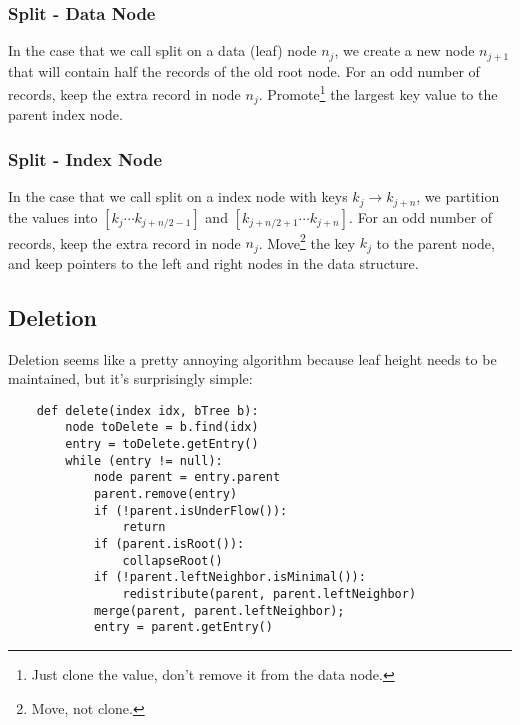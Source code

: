                     \subsubsection{Split - Data Node} %
                    \label{ssub:split_data_node}
                        In the case that we call split on a data (leaf) node $n_j$, we create a new node $n_{j+1}$ that will contain half the records of the old root node.
                        For an odd number of records, keep the extra record in node $n_j$.
                        Promote\footnote{Just clone the value, don't remove it from the data node.} the largest key value to the parent index node.
                    \subsubsection{Split - Index Node} %
                    \label{ssub:split_index_node}
                        In the case that we call split on a index node with keys $k_j \to k_{j+n}$, we partition the values into $[k_j \cdots k_{j+ n/2 - 1}]$ and $[k_{j+ n/2 + 1} \cdots  k_{j+n}]$.
                        For an odd number of records, keep the extra record in node $n_j$.
                        Move\footnote{Move, not clone.} the key $k_j$ to the parent node, and keep pointers to the left and right nodes in the data structure.
                \subsection{Deletion} %
                \label{sub:deletion}
                    Deletion seems like a pretty annoying algorithm because leaf height needs to be maintained, but it's surprisingly simple:
                    \begin{verbatim}
    def delete(index idx, bTree b):
        node toDelete = b.find(idx)
        entry = toDelete.getEntry()
        while (entry != null):
            node parent = entry.parent
            parent.remove(entry)
            if (!parent.isUnderFlow()):
                return
            if (parent.isRoot()):
                collapseRoot()
            if (!parent.leftNeighbor.isMinimal()):
                redistribute(parent, parent.leftNeighbor)
            merge(parent, parent.leftNeighbor);
            entry = parent.getEntry()
                    \end{verbatim}
